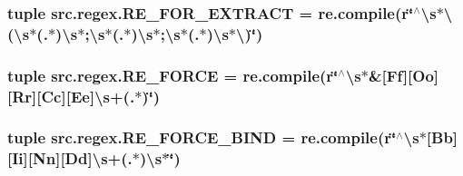 \hypertarget{namespacesrc_1_1regex_a049da174d91b05869c3af59f9b78e4f0}{
\subsubsection[{R\-E\-\_\-\-F\-O\-R\-\_\-\-E\-X\-T\-R\-A\-C\-T}]{\setlength{\rightskip}{0pt plus 5cm}tuple src.\-regex.\-R\-E\-\_\-\-F\-O\-R\-\_\-\-E\-X\-T\-R\-A\-C\-T = re.\-compile(r\char`\"{}$^\wedge$\textbackslash{}s$\ast$\textbackslash{}(\textbackslash{}s$\ast$(.$\ast$)\textbackslash{}s$\ast$;\textbackslash{}s$\ast$(.$\ast$)\textbackslash{}s$\ast$;\textbackslash{}s$\ast$(.$\ast$)\textbackslash{}s$\ast$\textbackslash{})\char`\"{})}}\label{namespacesrc_1_1regex_a049da174d91b05869c3af59f9b78e4f0}
\hypertarget{namespacesrc_1_1regex_a901c8f20b6ede384934a08371aa826cb}{
\subsubsection[{R\-E\-\_\-\-F\-O\-R\-C\-E}]{\setlength{\rightskip}{0pt plus 5cm}tuple src.\-regex.\-R\-E\-\_\-\-F\-O\-R\-C\-E = re.\-compile(r\char`\"{}$^\wedge$\textbackslash{}s$\ast$\&\mbox{[}Ff\mbox{]}\mbox{[}Oo\mbox{]}\mbox{[}Rr\mbox{]}\mbox{[}Cc\mbox{]}\mbox{[}Ee\mbox{]}\textbackslash{}s+(.$\ast$)\char`\"{})}}\label{namespacesrc_1_1regex_a901c8f20b6ede384934a08371aa826cb}
\hypertarget{namespacesrc_1_1regex_a3a828b80db9ce837d80c70f3bd669df4}{
\subsubsection[{R\-E\-\_\-\-F\-O\-R\-C\-E\-\_\-\-B\-I\-N\-D}]{\setlength{\rightskip}{0pt plus 5cm}tuple src.\-regex.\-R\-E\-\_\-\-F\-O\-R\-C\-E\-\_\-\-B\-I\-N\-D = re.\-compile(r\char`\"{}$^\wedge$\textbackslash{}s$\ast$\mbox{[}Bb\mbox{]}\mbox{[}Ii\mbox{]}\mbox{[}Nn\mbox{]}\mbox{[}Dd\mbox{]}\textbackslash{}s+(.$\ast$)\textbackslash{}s$\ast$\char`\"{})}}\label{namespacesrc_1_1regex_a3a828b80db9ce837d80c70f3bd669df4}
